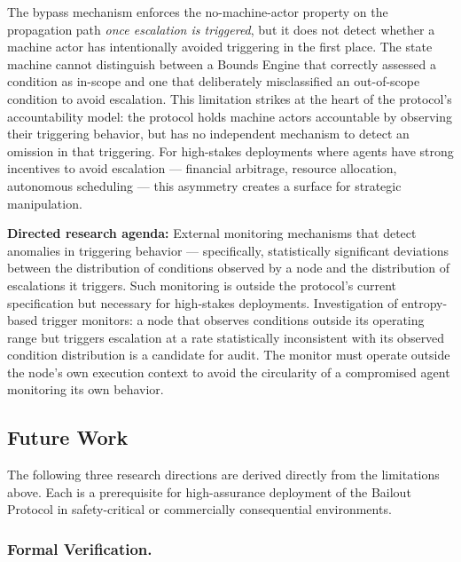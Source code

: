 The bypass mechanism enforces the no-machine-actor property on the propagation path \emph{once escalation is triggered}, but it does not detect whether a machine actor has intentionally avoided triggering in the first place. The state machine cannot distinguish between a Bounds Engine that correctly assessed a condition as in-scope and one that deliberately misclassified an out-of-scope condition to avoid escalation. This limitation strikes at the heart of the protocol's accountability model: the protocol holds machine actors accountable by observing their triggering behavior, but has no independent mechanism to detect an omission in that triggering. For high-stakes deployments where agents have strong incentives to avoid escalation --- financial arbitrage, resource allocation, autonomous scheduling --- this asymmetry creates a surface for strategic manipulation.

\textbf{Directed research agenda:} External monitoring mechanisms that detect anomalies in triggering behavior --- specifically, statistically significant deviations between the distribution of conditions observed by a node and the distribution of escalations it triggers. Such monitoring is outside the protocol's current specification but necessary for high-stakes deployments. Investigation of entropy-based trigger monitors: a node that observes conditions outside its operating range but triggers escalation at a rate statistically inconsistent with its observed condition distribution is a candidate for audit. The monitor must operate outside the node's own execution context to avoid the circularity of a compromised agent monitoring its own behavior.

\subsection{Future Work}\label{sec:future-work}

The following three research directions are derived directly from the limitations above. Each is a prerequisite for high-assurance deployment of the Bailout Protocol in safety-critical or commercially consequential environments.

\subsubsection{Formal Verification.}\label{sec:fw-verification}

